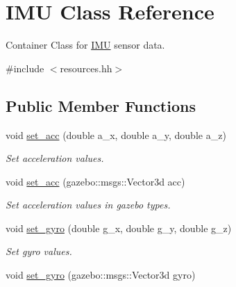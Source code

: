 \hypertarget{classIMU}{\section{\-I\-M\-U \-Class \-Reference}
\label{classIMU}
}


\-Container \-Class for \hyperlink{classIMU}{\-I\-M\-U} sensor data.  




{\ttfamily \#include $<$resources.\-hh$>$}

\subsection*{\-Public \-Member \-Functions}
\begin{DoxyCompactItemize}
\item 
\hypertarget{classIMU_a613d03d8dbf949cdf1bbe8acad3b687f}{void \hyperlink{classIMU_a613d03d8dbf949cdf1bbe8acad3b687f}{set\-\_\-acc} (double a\-\_\-x, double a\-\_\-y, double a\-\_\-z)}\label{classIMU_a613d03d8dbf949cdf1bbe8acad3b687f}

\begin{DoxyCompactList}\small\item\em \-Set acceleration values. \end{DoxyCompactList}\item 
\hypertarget{classIMU_a5187c130fb52b8be46978ea138103b31}{void \hyperlink{classIMU_a5187c130fb52b8be46978ea138103b31}{set\-\_\-acc} (gazebo\-::msgs\-::\-Vector3d acc)}\label{classIMU_a5187c130fb52b8be46978ea138103b31}

\begin{DoxyCompactList}\small\item\em \-Set acceleration values in gazebo types. \end{DoxyCompactList}\item 
\hypertarget{classIMU_a2c0cbafc7bc6acf142a6720f67ef8a1f}{void \hyperlink{classIMU_a2c0cbafc7bc6acf142a6720f67ef8a1f}{set\-\_\-gyro} (double g\-\_\-x, double g\-\_\-y, double g\-\_\-z)}\label{classIMU_a2c0cbafc7bc6acf142a6720f67ef8a1f}

\begin{DoxyCompactList}\small\item\em \-Set gyro values. \end{DoxyCompactList}\item 
\hypertarget{classIMU_af35a3067088c5ffe0acbcfe5eeedcb3b}{void \hyperlink{classIMU_af35a3067088c5ffe0acbcfe5eeedcb3b}{set\-\_\-gyro} (gazebo\-::msgs\-::\-Vector3d gyro)}\label{classIMU_af35a3067088c5ffe0acbcfe5eeedcb3b}


\end{DoxyCompactItemize}

